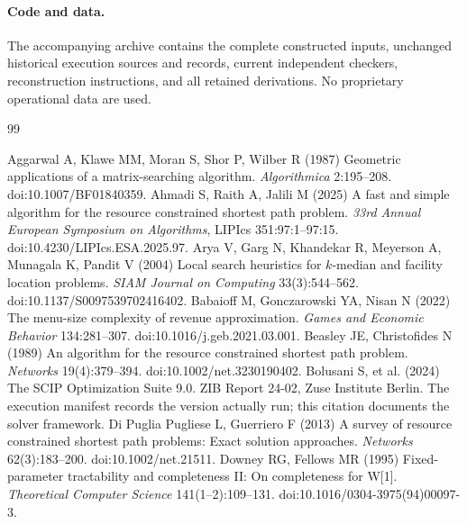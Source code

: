 \documentclass[11pt,letterpaper]{article}
\theoremstyle{definition}\newtheorem{remark}[theorem]{Remark}
\begin{document}
\paragraph{Code and data.} The accompanying archive contains the complete constructed inputs, unchanged historical execution sources and records, current independent checkers, reconstruction instructions, and all retained derivations. No proprietary operational data are used.
\clearpage{}\label{refs-start}
\begin{thebibliography}{99}\raggedright
{}
Aggarwal A, Klawe MM, Moran S, Shor P, Wilber R (1987) Geometric applications of a matrix-searching algorithm. \emph{Algorithmica} 2:195--208. doi:10.1007/BF01840359.
Ahmadi S, Raith A, Jalili M (2025) A fast and simple algorithm for the resource constrained shortest path problem. \emph{33rd Annual European Symposium on Algorithms}, LIPIcs 351:97:1--97:15. doi:10.4230/LIPIcs.ESA.2025.97.
Arya V, Garg N, Khandekar R, Meyerson A, Munagala K, Pandit V (2004) Local search heuristics for $k$-median and facility location problems. \emph{SIAM Journal on Computing} 33(3):544--562. doi:10.1137/S0097539702416402.
Babaioff M, Gonczarowski YA, Nisan N (2022) The menu-size complexity of revenue approximation. \emph{Games and Economic Behavior} 134:281--307. doi:10.1016/j.geb.2021.03.001.
Beasley JE, Christofides N (1989) An algorithm for the resource constrained shortest path problem. \emph{Networks} 19(4):379--394. doi:10.1002/net.3230190402.
Bolusani S, et al. (2024) The SCIP Optimization Suite 9.0. ZIB Report 24-02, Zuse Institute Berlin. The execution manifest records the version actually run; this citation documents the solver framework.
Di Puglia Pugliese L, Guerriero F (2013) A survey of resource constrained shortest path problems: Exact solution approaches. \emph{Networks} 62(3):183--200. doi:10.1002/net.21511.
Downey RG, Fellows MR (1995) Fixed-parameter tractability and completeness II: On completeness for W[1]. \emph{Theoretical Computer Science} 141(1--2):109--131. doi:10.1016/0304-3975(94)00097-3.

\end{thebibliography}
\end{document}
